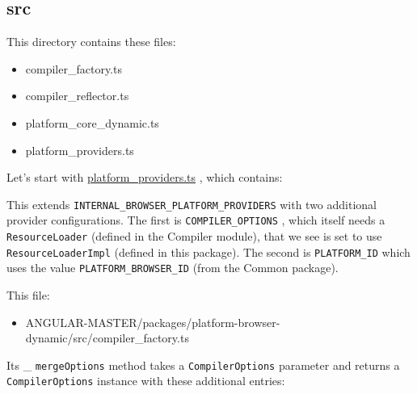 \subsection{src}

This directory contains these files:

\begin{itemize}
  \item compiler\_factory.ts
  \item compiler\_reflector.ts
  \item platform\_core\_dynamic.ts
  \item platform\_providers.ts
\end{itemize}

Let’s start with
\url{platform_providers.ts}
, which contains:



This extends
\texttt{INTERNAL\_BROWSER\_PLATFORM\_PROVIDERS}
with two additional provider
configurations. The first is
\texttt{COMPILER\_OPTIONS}
, which itself needs a
\texttt{ResourceLoader}
(defined in the Compiler module), that we see is set to use
\texttt{ResourceLoaderImpl}
(defined in this package).  The second is
\texttt{PLATFORM\_ID}
which uses the value
\texttt{PLATFORM\_BROWSER\_ID}
(from the Common package).

This file:

\begin{itemize}
  \item ANGULAR-MASTER/packages/platform-browser-dynamic/src/compiler\_factory.ts
\end{itemize}

Its \_
\texttt{mergeOptions}
method takes a
\texttt{CompilerOptions}
parameter and returns a
\texttt{CompilerOptions}
instance with these additional entries:


